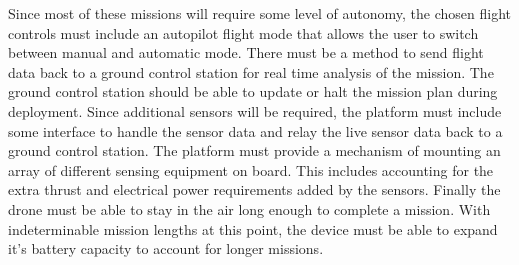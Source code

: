 		Since most of these missions will require some level of autonomy, the chosen flight controls must include an autopilot flight mode that allows the user to switch between manual and automatic mode. There must be a method to send flight data back to a ground control station for real time analysis of the mission. The ground control station should be able to update or halt the mission plan during deployment. Since additional sensors will be required, the platform must include some interface to handle the sensor data and relay the live sensor data back to a ground control station. The platform must provide a mechanism of mounting an array of different sensing equipment on board. This includes accounting for the extra thrust and electrical power requirements added by the sensors. Finally the drone must be able to stay in the air long enough to complete a mission. With indeterminable mission lengths at this point, the device must be able to expand it's battery capacity to account for longer missions.
	











